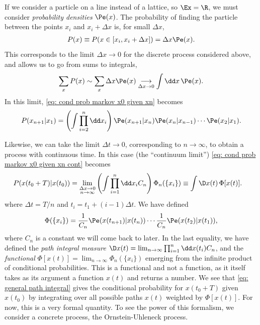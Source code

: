 If we consider a particle on a line instead of a lattice, so $\Ex = \R$, we must consider \emph{probability densities} $\Pe(x)$.
The probability of finding the particle between the points $x_i$ and $x_i + \Delta x$ is, for small $\Delta x$,
%
\begin{align}
    P(x) \equiv P(x \in [x_i, x_i + \Delta x]) = \Delta x \Pe(x).
\end{align}
%
This corresponds to the limit $\Delta x \rightarrow 0$ for the discrete process considered above, and allows us to go from sums to integrals,
%
\begin{align}
    \sum_{x} P(x) \sim \sum_{x} \Delta x \Pe(x) \underset{\Delta x \rightarrow 0}{\longrightarrow} \int \dd x \, \Pe(x).
\end{align}
%
In this limit, \autoref{eq: cond prob markov x0 given xn} becomes
%
\begin{align}\label{eq: cond prob markov x0 given xn cont}
    P(x_{n+1}|x_1) 
    = \left(\int \prod_{i=2}^{n} \dd x_i\right)
    \Pe(x_{n+1}|x_n) \Pe(x_n| x_{n-1})\cdots \Pe(x_2|x_1).
\end{align}

Likewise, we can take the limit $\Delta t\rightarrow 0$, corresponding to $n\rightarrow\infty$, to obtain a process with continuous time.
In this case (the ``continuum limit'') \autoref{eq: cond prob markov x0 given xn cont} becomes
%
\begin{align}\label{eq: general path integral}
    P(x(t_0 + T) | x(t_0) ) 
    &
    =
    \lim_{
        \substack{\Delta x \rightarrow 0\\n\rightarrow \infty}
    }
    \left(\int \prod_{i = 1}^{n} \dd x_i C_n\right)
    \Phi_n(\{x_i\})
    \equiv
    \int \D x(t) \, \Phi[x(t)].
\end{align}
%
where $\Delta t = T/n$ and $t_i = t_1 + (i-1)\Delta t$.
We have defined 
%
\begin{align}
    \Phi(\{x_i\}) = \frac{1}{C_n} \Pe(x(t_{n+1}) | x(t_n) ) \cdots \frac{1}{C_n} \Pe(x(t_{2}) | x(t_1) ),
\end{align}
%
where $C_n$ is a constant we will come back to later.
In the last equality, we have defined the \emph{path integral measure} $\D x(t) = \lim_{n \rightarrow \infty} \prod_{i=1}^n \dd x(t_i) C_n$,
and the \emph{functional} $\Phi[x(t)]= \lim_{n \rightarrow \infty} \Phi_n(\{x_i\})$ emerging from the infinite product of conditional probabilities.
This is a functional and not a function, as it itself takes as its argument a function $x(t)$ and returns a number.
We see that \autoref{eq: general path integral} gives the conditional probability for $x(t_0 + T)$ given $x(t_0)$ by integrating over all possible paths $x(t)$ weighted by $\Phi[x(t)]$.
For now, this is a very formal quantity.
To see the power of this formalism, we consider a concrete process, the Ornstein-Uhleneck process.



